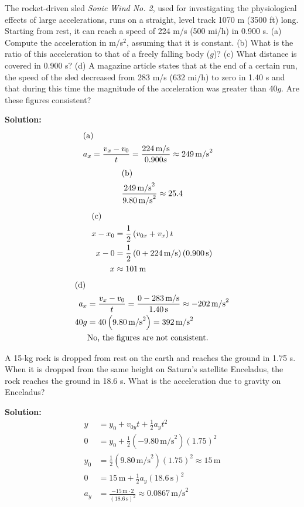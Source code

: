 \documentclass[12pt]{article}
\newenvironment{problem}[2][]{
    \begin{trivlist}
        \item[
            {\bfseries #1}
            {\bfseries #2}
        ]
}{\end{trivlist}}
\newcommand{\solution}{\medskip\noindent\textbf{Solution:}}
\newcommand{\Part}[1]{\shortintertext{(#1)}}
\newcommand{\unit}[1]{\, \text{#1}}
\newcommand{\m}{\unit{m}}
\newcommand{\mps}{\unit{m/s}}
\newcommand{\s}{\unit{s}}
\begin{document}
\begin{problem}{2.45}
    The rocket-driven sled \textit{Sonic Wind No. 2}, used for investigating the physiological effects of large accelerations, runs on a straight, level track 1070 m (3500 ft) long.
    Starting from rest, it can reach a speed of 224 m/s (500 mi/h) in 0.900 s.
    (a) Compute the acceleration in m/s$^2$, assuming that it is constant.
    (b) What is the ratio of this acceleration to that of a freely falling body ($g$)?
    (c) What distance is covered in 0.900 s?
    (d) A magazine article states that at the end of a certain run, the speed of the sled decreased from 283 m/s (632 mi/h) to zero in 1.40 s and that during this time the magnitude of the acceleration was greater than 40$g$.
    Are these figures consistent?

    \solution
    \begin{align}
        \Part{a}
        a_x &= \frac{v_x - v_0}{t} = \frac{224 \mps}{0.900 s} \approx 249 \mps^2 
    \end{align}
    \begin{align}
        \Part{b}
        \frac{249 \mps^2}{9.80 \mps^2} \approx 25.4
    \end{align}
    \begin{align}
        \Part{c}
        x - x_0 &= \frac{1}{2} \left(v_{0x} + v_x\right) t \\
        x - 0 &= \frac{1}{2} \left(0 + 224 \mps\right) \left(0.900 \s\right) \\
        x &\approx 101 \m
    \end{align}
    \begin{align}
        \Part{d}
        a_x &= \frac{v_x - v_0}{t} = \frac{0 - 283 \mps}{1.40 \s} \approx -202 \mps^2 \\
        40g &= 40 \left(9.80 \mps^2\right) = 392 \mps^2 \\
        &\text{No, the figures are not consistent.}
    \end{align}
\end{problem}

\begin{problem}{2.47}
    A 15-kg rock is dropped from rest on the earth and reaches the ground in 1.75 s.
    When it is dropped from the same height on Saturn's satellite Enceladus, the rock reaches the ground in 18.6 s.
    What is the acceleration due to gravity on Enceladus?

    \solution
    \begin{align}
        y &= y_0 + v_{0y} t + \frac{1}{2} a_y t^2 \\
        0 &= y_0 + \frac{1}{2} \left(-9.80 \mps^2\right) \left(1.75 \right)^2 \\
        y_0 &= \frac{1}{2} \left(9.80 \mps^2\right) \left(1.75 \right)^2 \approx 15 \m \\
        0 &= 15 \m + \frac{1}{2} a_y \left(18.6 \s\right)^2 \\
        a_y &= \frac{- 15 \m \cdot 2}{\left(18.6 \s\right)^2} \approx 0.0867 \mps^2
    \end{align}
\end{problem}
\end{document}
